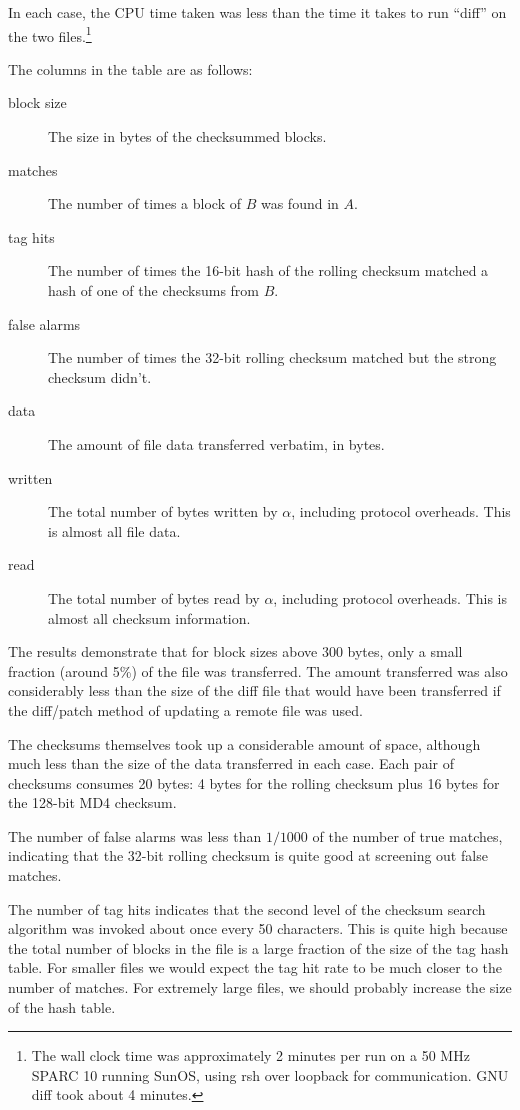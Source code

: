 \documentclass[a4paper]{article}
\begin{document}
In each case, the CPU time taken was less than the
time it takes to run ``diff'' on the two files.\footnote{The wall
  clock time was approximately 2 minutes per run on a 50 MHz SPARC 10
  running SunOS, using rsh over loopback for communication.  GNU diff
  took about 4 minutes.}

The columns in the table are as follows:

\begin{description}
\item [block size] The size in bytes of the checksummed blocks.
\item [matches] The number of times a block of $B$ was found in $A$.
\item [tag hits] The number of times the 16-bit hash of the rolling
  checksum matched a hash of one of the checksums from $B$.
\item [false alarms] The number of times the 32-bit rolling checksum
  matched but the strong checksum didn't.
\item [data] The amount of file data transferred verbatim, in bytes.
\item [written] The total number of bytes written by $\alpha$,
  including protocol overheads. This is almost all file data.
\item [read] The total number of bytes read by $\alpha$, including
  protocol overheads. This is almost all checksum information.
\end{description}

The results demonstrate that for block sizes above 300 bytes, only a
small fraction (around 5\%) of the file was transferred. The amount
transferred was also considerably less than the size of the diff file
that would have been transferred if the diff/patch method of updating
a remote file was used.

The checksums themselves took up a considerable amount of space,
although much less than the size of the data transferred in each
case. Each pair of checksums consumes 20 bytes: 4 bytes for the
rolling checksum plus 16 bytes for the 128-bit MD4 checksum.

The number of false alarms was less than $1/1000$ of the number of
true matches, indicating that the 32-bit rolling checksum is quite
good at screening out false matches.

The number of tag hits indicates that the second level of the
checksum search algorithm was invoked about once every 50
characters.  This is quite high because the total number of blocks in
the file is a large fraction of the size of the tag hash table. For
smaller files we would expect the tag hit rate to be much closer to
the number of matches.  For extremely large files, we should probably
increase the size of the hash table.
\end{document}
